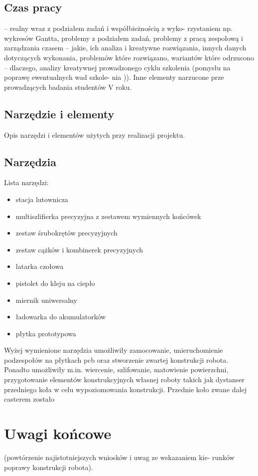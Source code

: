 \documentclass[11pt,a4paper]{article}
\begin{document}
\subsection{Czas pracy} – realny wraz z podziałem zadań i współbieżnością z wyko-
rzystaniem np. wykresów Gantta, problemy z podziałem zadań, problemy z pracą zespołową i
zarządzania czasem – jakie, ich analiza i kreatywne rozwiązania, innych danych dotyczących
wykonania, problemów które rozwiązano, wariantów które odrzucono – dlaczego, analizy
kreatywnej prowadzonego cyklu szkolenia (pomysłu na poprawę ewentualnych wad szkole-
nia )). Inne elementy narzucone prze prowadzących badania studentów V roku.

\subsection{Narzędzie i elementy}
Opis narzędzi i elementów użytych przy realizacji projektu.
\subsection{Narzędzia}
Lista narzędzi:
\begin{itemize}
  \item stacja lutownicza
  \item multiszlifierka precyzyjna z zestawem wymiennych końcówek
  \item zestaw śrubokrętów precyzyjnych
  \item zestaw cążków i kombinerek precyzyjnych
  \item latarka czołowa
  \item pistolet do kleju na ciepło
  \item miernik uniwersalny
  \item ładowarka do akumulatorków
  \item płytka prototypowa
\end{itemize}

Wyżej wymienione narzędzia umożliwiły zamocowanie, unieruchomienie podzespołów na płytkach pcb oraz stworzenie zwartej konstrukcji robota. Ponadto umożliwiły m.in. wiercenie, szlifowanie, matowienie powierzchni, przygotowanie elementów konstrukcyjnych własnej roboty takich jak dystanser przedniego koła w celu wypoziomowania konstrukcji.
Przednie koło zwane dalej casterem zostało 

\section{Uwagi końcowe} (powtórzenie najistotniejszych wniosków i uwag ze wskazaniem kie-
runków poprawy konstrukcji robota).
\end{document}
